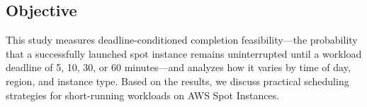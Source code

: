 \documentclass[runningheads]{llncs}
\begin{document}




\subsection{Objective}

This study measures deadline-conditioned completion feasibility—the probability that a successfully launched spot instance remains uninterrupted until a workload deadline of 5, 10, 30, or 60 minutes—and analyzes how it varies by time of day, region, and instance type. Based on the results, we discuss practical scheduling strategies for short-running workloads on AWS Spot Instances.
\end{document}
